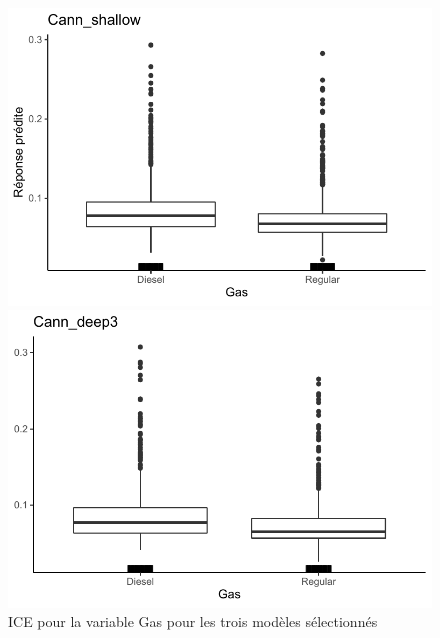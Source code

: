 \begin{figure}[b]
\begin{minipage}{0.45\linewidth}
\end{minipage}
\end{figure}

\begin{figure}[b]
\caption{\label{fig:ice3Gas} ICE pour la variable Gas pour les trois modèles sélectionnés}
\centering
\begin{minipage}{0.45\linewidth}
\includegraphics[scale=0.6]{Graphiques/iceGasShallow}
\end{minipage}
\hfill
\begin{minipage}{0.45\linewidth}
\includegraphics[scale=0.6]{Graphiques/iceGasCann}
\end{minipage}
\hfill
\begin{minipage}{0.45\linewidth}

\end{minipage}
\end{figure}
